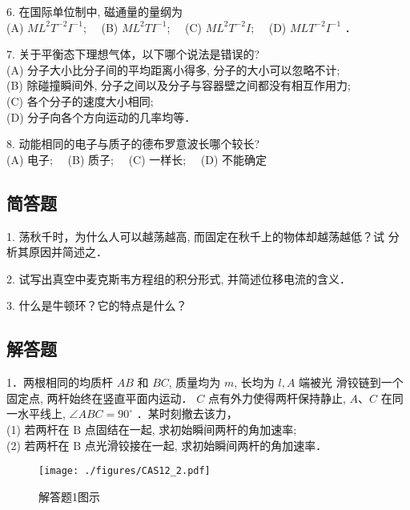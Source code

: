 6. 在国际单位制中, 磁通量的量纲为\\
(A) $M L^{2} T^{-2} I^{-1}$;$\quad$
(B) $M L^{2} T I^{-1}$;$\quad$
(C) $M L^{2} T^{-2} I$;$\quad$
(D) $M L T^{-2} I^{-1}$ ．

7. 关于平衡态下理想气体，以下哪个说法是错误的?\\
(A) 分子大小比分子间的平均距离小得多, 分子的大小可以忽略不计;\\
(B) 除碰撞瞬间外, 分子之间以及分子与容器壁之间都没有相互作用力;\\
(C) 各个分子的速度大小相同;\\
(D) 分子向各个方向运动的几率均等．

8. 动能相同的电子与质子的德布罗意波长哪个较长?\\
(A) 电子;$\quad$
(B) 质子;$\quad$
(C) 一样长;$\quad$
(D) 不能确定

\subsection{简答题}

1. 荡秋千时，为什么人可以越荡越高, 而固定在秋千上的物体却越荡越低？试 分析其原因并简述之．

2. 试写出真空中麦克斯韦方程组的积分形式, 并简述位移电流的含义．

3. 什么是牛顿环？它的特点是什么？
\subsection{解答题}
1．两根相同的均质杆 $A B$ 和 $B C$, 质量均为 $m$, 长均为 $l, A$ 端被光 滑铰链到一个固定点, 两杆始终在竖直平面内运动． $C$ 点有外力使得两杆保持静止, $A $、$ C$ 在同一水平线上, $\angle A B C=90^{\circ}$ ．某时刻撤去该力，\\
(1) 若两杆在 $\mathrm{B}$ 点固结在一起, 求初始瞬间两杆的角加速率;\\
(2) 若两杆在 $\mathrm{B}$ 点光滑铰接在一起, 求初始瞬间两杆的角加速率．
\begin{figure}[ht]
\centering
\texttt{[image: ./figures/CAS12\_2.pdf]}
\caption{解答题1图示} \label{CAS12_fig2}
\end{figure}

